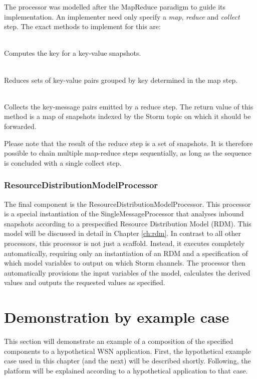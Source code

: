 The processor was modelled after the MapReduce paradigm \cite{mapreduce} to guide its implementation. An implementer need only specify a \emph{map}, \emph{reduce} and \emph{collect} step.  The exact methods to implement for this are: 
\begin{description}[font=\normalfont]
\nospace
\item[\emph{map(Message m) : String}] \hfill \\ Computes the key for a key-value snapshots.
\item[\emph{reduce(String key, List\textless Message\textgreater\ l) : Message}] \hfill \\ Reduces sets of key-value pairs grouped by key determined in the map step.
\item[\emph{collect(Map\textless String,Message\textgreater\ m) : Map\textless String,Message\textgreater}] \hfill \\ Collects the key-message pairs emitted by a reduce step. The return value of this method is a map of snapshots indexed by the Storm topic on which it should be forwarded.
\end{description}
Please note that the result of the reduce step is a set of snapshots. It is therefore possible to chain multiple map-reduce steps sequentially, as long as the sequence is concluded with a single collect step.

\subsubsection*{ResourceDistributionModelProcessor}
The final component is the ResourceDistributionModelProcessor. This processor is a special instantiation of the SingleMessageProcessor that analyses inbound snapshots according to a prespecified Resource Distribution Model (RDM). This model will be discussed in detail in Chapter \ref{ch:rdm}. In contrast to all other processors, this processor is not just a scaffold. Instead, it executes completely automatically, requiring only an instantiation of an RDM and a specification of which model variables to output on which Storm channels. The processor then automatically provisions the input variables of the model, calculates the derived values and outputs the requested values as specified.

\section{Demonstration by example case}
\label{sec:example_application_topology}
This section will demonstrate an example of a composition of the specified components to a hypothetical WSN application. First, the hypothetical example case used in this chapter (and the next) will be described shortly. Following, the platform will be explained according to a hypothetical application to that case.

